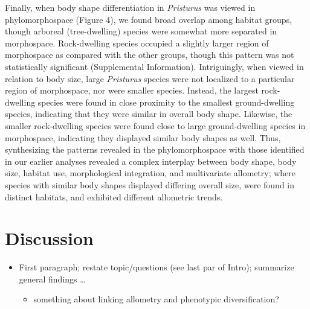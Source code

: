 \documentclass[
  11pt,
]{article}
\providecommand{\tightlist}{%
  \setlength{\itemsep}{0pt}\setlength{\parskip}{0pt}}
\providecommand{\DIFaddbegin}{} %
\providecommand{\DIFaddend}{} %
\newcommand{\DIFaddincludegraphics}[2][]{{\color{blue}\fbox{\DIFOincludegraphics[#1]{#2}}}} %
\DeclareRobustCommand{\DIFaddbegin}{\DIFOaddbegin \let\includegraphics\DIFaddincludegraphics} %
\DeclareRobustCommand{\DIFaddend}{\DIFOaddend \let\includegraphics\DIFOincludegraphics} %
\begin{document}
\DIFaddend Finally, when body shape differentiation in \emph{Pristurus} was viewed
in phylomorphospace (Figure 4), we found broad overlap among habitat
groups, though arboreal (tree-dwelling) species were somewhat more
separated in morphospace. Rock-dwelling species occupied a slightly
larger region of morphospace as compared with the other groups, though
this pattern was not statistically significant (Supplemental
Information). Intriguingly, when viewed in relation to body size, large
\emph{Pristurus} species were not localized to a particular region of
morphospace, nor were smaller species. Instead, the largest
rock-dwelling species were found in close proximity to the smallest
ground-dwelling species, indicating that they were similar in overall
body shape. Likewise, the smaller rock-dwelling species were found close
to large ground-dwelling species in morphospace, indicating they
displayed similar body shapes as well. Thus, synthesizing the patterns
revealed in the phylomorphospace with those identified in our earlier
analyses revealed a complex interplay between body shape, body size,
habitat use, morphological integration, and multivariate allometry;
where species with similar body shapes displayed differing overall size,
were found in distinct habitats, and exhibited different allometric
trends.

\hypertarget{discussion}{%
\section{Discussion}\label{discussion}}

\begin{itemize}
\DIFaddbegin \tightlist
\DIFaddend \item
  First paragraph; restate topic/questions (see last par of Intro);
  summarize general findings \ldots{}

  \begin{itemize}
  \tightlist
  \item
    something about linking allometry and phenotypic diversification?
  \end{itemize}
\DIFaddbegin \end{itemize}
\end{document}
